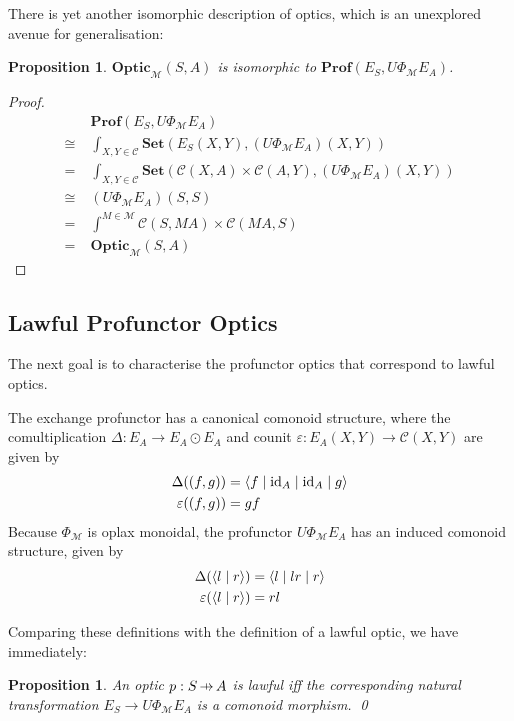 \documentclass[11pt,letterpaper]{article}
\theoremstyle{plain}
\newtheorem{proposition}[theorem]{Proposition}
\theoremstyle{definition}
\newcommand{\C}{\mathscr{C}}
\newcommand{\M}{\mathscr{M}}
\newcommand{\Pastro}{\Phi}
\newcommand{\Set}{\mathbf{Set}}
\newcommand{\Prof}{\mathbf{Prof}}
\newcommand{\Optic}{\mathbf{Optic}}
\newcommand{\id}{\mathrm{id}}
\newcommand{\rep}[2]{{\ensuremath \left\langle #1 \mid #2 \right\rangle}}
\newcommand{\repthree}[3]{{\ensuremath \langle #1 \mid #2 \mid #3 \rangle}}
\newcommand{\repfour}[4]{{\ensuremath \langle #1 \mid #2 \mid #3 \mid #4 \rangle}}
\newcommand{\hto}{\ensuremath{\,\mathaccent\shortmid\rightarrow\,}}
\begin{document}
There is yet another isomorphic description of optics, which is an unexplored avenue for generalisation:

\begin{proposition}
  $\Optic_\M(S, A)$ is isomorphic to $\Prof(E_S, U \Phi_\M E_A)$.
\end{proposition}
\begin{proof}
  \begin{align*}
    &\Prof(E_S, U \Phi_\M E_A) \\
    \cong\;&\int_{X,Y \in \C} \Set(E_S(X,Y), (U \Phi_\M E_A)(X,Y)) \\
    = \;&\int_{X,Y \in \C} \Set(\C(X,A) \times \C(A,Y), (U \Phi_\M E_A)(X,Y)) \\
    \cong \;& (U \Phi_\M E_A)(S,S) \\
    = \;&\int^{M \in \M} \C(S, MA) \times \C(MA, S) \\
    = \;&\Optic_\M(S, A)
  \end{align*}
\end{proof}

\subsection{Lawful Profunctor Optics}

The next goal is to characterise the profunctor optics that correspond to lawful optics.

The exchange profunctor has a canonical comonoid structure, where the comultiplication $\Delta : E_A \to E_A \odot E_A$ and counit $\varepsilon : E_A(X, Y) \to \C(X, Y)$ are given by
\begin{align*}
  \Delta((f, g)) &= \repfour{f}{\id_A}{\id_A}{g}  \\
  \varepsilon((f, g)) &= gf
\end{align*}
Because $\Pastro_\M$ is oplax monoidal, the profunctor $U\Pastro_\M E_A$ has an induced comonoid structure, given by
\begin{align*}
  \Delta(\rep{l}{r}) &= \repthree{l}{lr}{r} \\
  \varepsilon(\rep{l}{r}) &= rl
\end{align*}

Comparing these definitions with the definition of a lawful optic, we have immediately:

\begin{proposition}
  An optic $p : S \hto A$ is lawful iff the corresponding natural transformation $E_S \rightarrow U \Phi_\M E_A$ is a comonoid morphism. \qed
\end{proposition}
\end{document}
